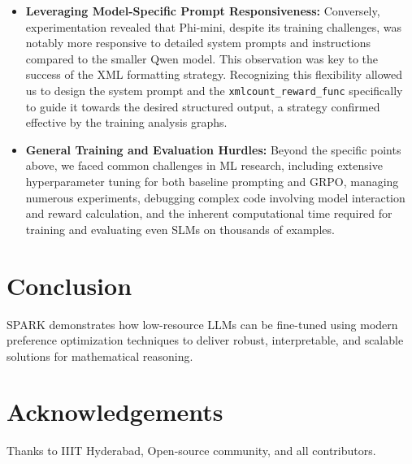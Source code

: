 \documentclass[11pt]{article}
\begin{document}
\begin{itemize}
\begin{itemize}
    \item \textbf{Leveraging Model-Specific Prompt Responsiveness:} Conversely, experimentation revealed that Phi-mini, despite its training challenges, was notably more responsive to detailed system prompts and instructions compared to the smaller Qwen model. This observation was key to the success of the XML formatting strategy. Recognizing this flexibility allowed us to design the system prompt and the \lstinline!xmlcount_reward_func! specifically to guide it towards the desired structured output, a strategy confirmed effective by the training analysis graphs.

    \item \textbf{General Training and Evaluation Hurdles:} Beyond the specific points above, we faced common challenges in ML research, including extensive hyperparameter tuning for both baseline prompting and GRPO, managing numerous experiments, debugging complex code involving model interaction and reward calculation, and the inherent computational time required for training and evaluating even SLMs on thousands of examples.
\end{itemize}


\section{Conclusion}
SPARK demonstrates how low-resource LLMs can be fine-tuned using modern preference optimization techniques to deliver robust, interpretable, and scalable solutions for mathematical reasoning.

\section*{Acknowledgements}
Thanks to IIIT Hyderabad, Open-source community, and all contributors.



\end{itemize}
\end{document}
